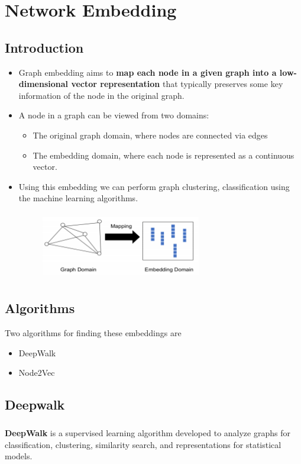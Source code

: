 \chapter{Network Embedding}


\section{Introduction}
\begin{itemize}
    \item Graph embedding aims to \textbf{map each node in a given graph into a low-dimensional vector representation} that typically preserves some key information of the node in the original graph.
    \item A node in a graph can be viewed from two domains:
    \begin{itemize}
        \item The original graph domain, where nodes are connected via edges
        \item The embedding domain, where each node is represented as a continuous vector.
    \end{itemize}
    \item Using this embedding we can perform graph clustering, classification using the machine learning algorithms.
    \begin{figure}[h] 
        \centering
        \includegraphics[height=3cm, width=7cm]{tex/img/Embedding.png} 
    \end{figure}
\end{itemize}
\section{Algorithms}
    Two algorithms for finding these embeddings are
    \begin{itemize}
        \item DeepWalk
        \item Node2Vec
    \end{itemize}
\newpage
\section{Deepwalk}
\paragraph{}\textbf{DeepWalk} is a supervised learning algorithm developed to analyze graphs for classification, clustering, similarity search, and representations for statistical models.
